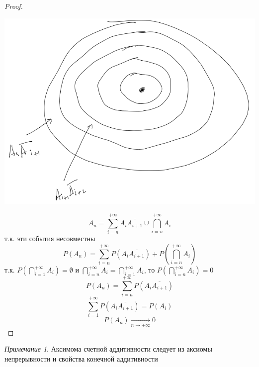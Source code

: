 \documentclass[oneside]{book}
\theoremstyle{plain}
\theoremstyle{remark}
\newtheorem*{remark}{Примечание}
\theoremstyle{definition}
\begin{document}
\begin{proof}
\-
\begin{center}
\includegraphics[scale=0.3]{2_1.png}
\end{center}
\[ A_n = \sum_{i = n}^{+ \infty} A_i\overline{A_{i + 1}} \cup \bigcap_{i = n}^{+ \infty}A_i \]
т.к. эти события несовместны
\[ P(A_n) = \sum_{i = n}^{+ \infty}P(A_i\overline{A_{i + 1}}) + P(\bigcap_{i = n}^{+\infty} A_i) \]
т.к. \(P(\bigcap_{i = 1}^{ + \infty} A_i) = \emptyset\) и \(\bigcap_{i = n}^{ +\infty}A_i = \bigcap_{i = 1}^{ + \infty}A_i\), то \(P(\bigcap_{i = n}^{ + \infty} A_i) = 0\) \\
\[ P(A_n) = \sum_{i = n}^{ + \infty} P(A_i \overline{A_{i + 1}}) \]
\[ \sum_{i = 1}^{ + \infty}P(A_i\overline{A_{i + 1}}) = P(A_i) \]
\[ P(A_n) \xrightarrow[n \to + \infty]{} 0 \]
\end{proof}
\begin{remark}
Аксимома счетной аддитивности следует из аксиомы непрерывности и свойства конечной аддитивности
\end{remark}
\end{document}
